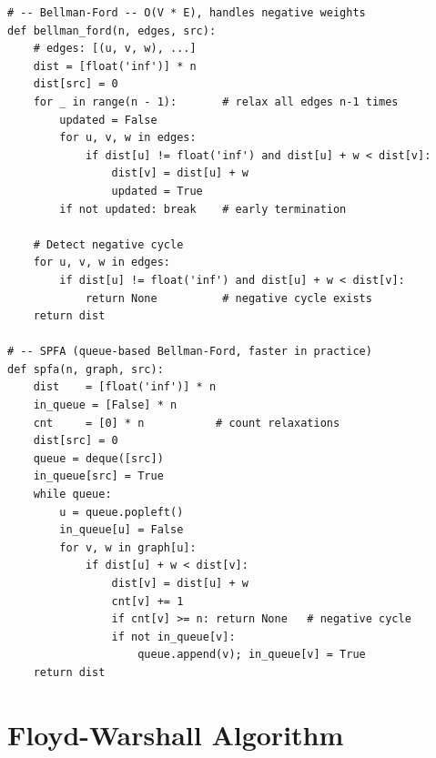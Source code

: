 \documentclass[11pt,a4paper]{report}
\begin{document}
\begin{lstlisting}
# -- Bellman-Ford -- O(V * E), handles negative weights
def bellman_ford(n, edges, src):
    # edges: [(u, v, w), ...]
    dist = [float('inf')] * n
    dist[src] = 0
    for _ in range(n - 1):       # relax all edges n-1 times
        updated = False
        for u, v, w in edges:
            if dist[u] != float('inf') and dist[u] + w < dist[v]:
                dist[v] = dist[u] + w
                updated = True
        if not updated: break    # early termination

    # Detect negative cycle
    for u, v, w in edges:
        if dist[u] != float('inf') and dist[u] + w < dist[v]:
            return None          # negative cycle exists
    return dist

# -- SPFA (queue-based Bellman-Ford, faster in practice)
def spfa(n, graph, src):
    dist    = [float('inf')] * n
    in_queue = [False] * n
    cnt     = [0] * n           # count relaxations
    dist[src] = 0
    queue = deque([src])
    in_queue[src] = True
    while queue:
        u = queue.popleft()
        in_queue[u] = False
        for v, w in graph[u]:
            if dist[u] + w < dist[v]:
                dist[v] = dist[u] + w
                cnt[v] += 1
                if cnt[v] >= n: return None   # negative cycle
                if not in_queue[v]:
                    queue.append(v); in_queue[v] = True
    return dist
\end{lstlisting}

\section{Floyd-Warshall Algorithm}
\end{document}
